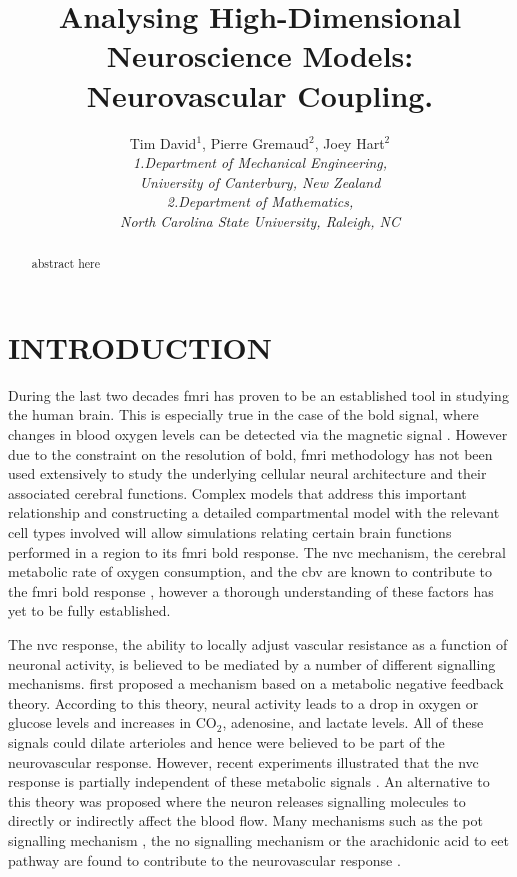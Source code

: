 \documentclass[12pt]{article}
\numberwithin{equation}{section}
\begin{document}
\title{Analysing High-Dimensional Neuroscience Models: Neurovascular Coupling. }
\author{ Tim David$^{1}$, Pierre Gremaud$^{2}$, Joey Hart$^{2}$\\
\textit{1.Department of Mechanical Engineering,} \\
\textit{University of Canterbury, New Zealand}\\
\textit{2.Department of Mathematics,}\\
\textit{North Carolina State University, Raleigh, NC}\\
}
\maketitle
\thispagestyle{empty}

\begin{abstract}
abstract here 
\end{abstract}
\section{INTRODUCTION}
During the last two decades \gls{fmri} has proven to be an established tool in studying the human brain. This is especially true in the case of the \gls{bold} signal, where changes in blood oxygen levels can be detected via the magnetic signal  \cite{Ogawa1990}. However due to the constraint on the resolution of \gls{bold}, \gls{fmri} methodology has not been used extensively to study the underlying cellular neural architecture and their associated cerebral functions. Complex models that address this important relationship and constructing a detailed compartmental model with the relevant cell types involved will allow simulations relating certain brain functions performed in a region to its \gls{fmri} \gls{bold} response. The \gls{nvc} mechanism, the cerebral metabolic rate of oxygen consumption, and the \gls{cbv} are known to contribute to the \gls{fmri} \gls{bold} response \citep{Buxton2004}, however a thorough understanding of these factors has yet to be fully established.

The \gls{nvc} response, the ability to locally adjust vascular resistance as a function of neuronal activity, is believed to be mediated by a number of different signalling mechanisms. \citet{Roy1890} first proposed a  mechanism based on a metabolic negative feedback theory. According to this theory, neural activity leads to a drop in oxygen or glucose levels and increases in CO$_2$, adenosine, and lactate levels. All of these signals could dilate arterioles and hence were believed to be part of the neurovascular response. However, recent experiments illustrated that the \gls{nvc} response is partially independent of these metabolic signals \citep{Leithner2010, Lindauer2010, Mintun2001, Powers1996, Makani2010}. An alternative to this theory was proposed where the neuron releases signalling molecules to directly or indirectly affect the blood flow. Many mechanisms such as the \gls{pot} signalling mechanism \cite{Filosa2006}, the \gls{no} signalling mechanism or the arachidonic acid to \gls{eet} pathway are found to contribute to the neurovascular response \citep{Attwell2010}.
\end{document}
